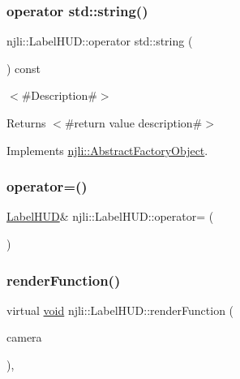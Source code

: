 \subsubsection{\texorpdfstring{operator std\+::string()}{operator std::string()}}
{\footnotesize\ttfamily njli\+::\+Label\+H\+U\+D\+::operator std\+::string (\begin{DoxyParamCaption}{ }\end{DoxyParamCaption}) const\hspace{0.3cm}{\ttfamily [virtual]}}

$<$\#\+Description\#$>$

\begin{DoxyReturn}{Returns}
$<$\#return value description\#$>$ 
\end{DoxyReturn}


Implements \mbox{\hyperlink{classnjli_1_1_abstract_factory_object_a838f4fa7e65cace6098aab5222892942}{njli\+::\+Abstract\+Factory\+Object}}.

\mbox{\label{classnjli_1_1_label_h_u_d_ae4a370ed6012f63081797ee083d4976c}} 
\subsubsection{\texorpdfstring{operator=()}{operator=()}}
{\footnotesize\ttfamily \mbox{\hyperlink{classnjli_1_1_label_h_u_d}{Label\+H\+UD}}\& njli\+::\+Label\+H\+U\+D\+::operator= (\begin{DoxyParamCaption}\item[{const \mbox{\hyperlink{classnjli_1_1_label_h_u_d}{Label\+H\+UD}} \&}]{ }\end{DoxyParamCaption})\hspace{0.3cm}{\ttfamily [protected]}}

\mbox{\label{classnjli_1_1_label_h_u_d_a40fae179595de9d7d29bdd7bc9fbbcf7}} 
\subsubsection{\texorpdfstring{render\+Function()}{renderFunction()}}
{\footnotesize\ttfamily virtual \mbox{\hyperlink{_thread_8h_af1e856da2e658414cb2456cb6f7ebc66}{void}} njli\+::\+Label\+H\+U\+D\+::render\+Function (\begin{DoxyParamCaption}\item[{\mbox{\hyperlink{classnjli_1_1_camera}{Camera}} $\ast$}]{camera }\end{DoxyParamCaption})\hspace{0.3cm}{\ttfamily [protected]}, {\ttfamily [virtual]}}



